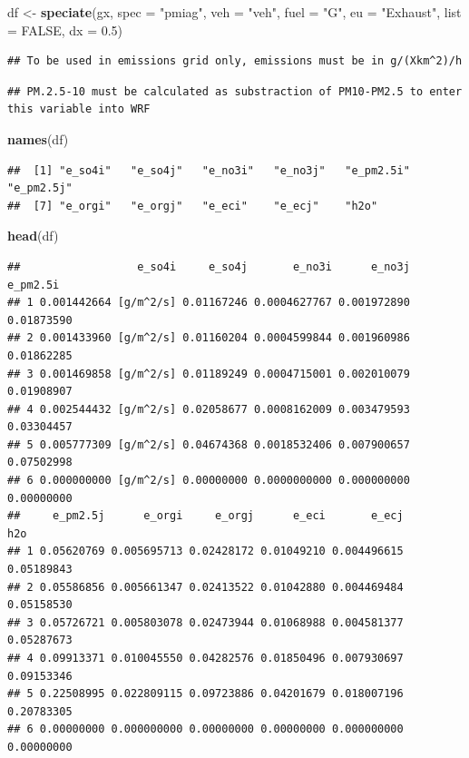 \documentclass[12pt,graybox,envcountchap,sectrefs]{krantz}
\makeatletter
\newenvironment{Shaded}{\begin{snugshade}}{\end{snugshade}}
\newcommand{\KeywordTok}[1]{\textcolor[rgb]{0.13,0.29,0.53}{\textbf{#1}}}
\newcommand{\DataTypeTok}[1]{\textcolor[rgb]{0.13,0.29,0.53}{#1}}
\newcommand{\FloatTok}[1]{\textcolor[rgb]{0.00,0.00,0.81}{#1}}
\newcommand{\StringTok}[1]{\textcolor[rgb]{0.31,0.60,0.02}{#1}}
\newcommand{\OtherTok}[1]{\textcolor[rgb]{0.56,0.35,0.01}{#1}}
\newcommand{\NormalTok}[1]{#1}
\newenvironment{kframe}{%
\medskip{}
\setlength{\fboxsep}{.8em}
 \def\at@end@of@kframe{}%
 \ifinner\ifhmode%
  \def\at@end@of@kframe{\end{minipage}}%
  \begin{minipage}{\columnwidth}%
 \fi\fi%
 \def\FrameCommand##1{\hskip\@totalleftmargin \hskip-\fboxsep
 \colorbox{shadecolor}{##1}\hskip-\fboxsep
     \hskip-\linewidth \hskip-\@totalleftmargin \hskip\columnwidth}%
 \MakeFramed {\advance\hsize-\width
   \@totalleftmargin\z@ \linewidth\hsize
   \@setminipage}}%
 {\par\unskip\endMakeFramed%
 \at@end@of@kframe}
\renewenvironment{Shaded}{\begin{kframe}}{\end{kframe}}
\theoremstyle{definition}
\theoremstyle{definition}
\theoremstyle{definition}
\theoremstyle{remark}
\makeatother
\begin{document}
\begin{Shaded}
\begin{Highlighting}[]
\NormalTok{df <-}\StringTok{ }\KeywordTok{speciate}\NormalTok{(gx, }\DataTypeTok{spec =} \StringTok{"pmiag"}\NormalTok{, }\DataTypeTok{veh =} \StringTok{"veh"}\NormalTok{, }\DataTypeTok{fuel =} \StringTok{"G"}\NormalTok{,}
               \DataTypeTok{eu =} \StringTok{"Exhaust"}\NormalTok{, }\DataTypeTok{list =} \OtherTok{FALSE}\NormalTok{, }\DataTypeTok{dx =} \FloatTok{0.5}\NormalTok{)}
\end{Highlighting}
\end{Shaded}

\begin{verbatim}
## To be used in emissions grid only, emissions must be in g/(Xkm^2)/h
\end{verbatim}

\begin{verbatim}
## PM.2.5-10 must be calculated as substraction of PM10-PM2.5 to enter this variable into WRF
\end{verbatim}

\begin{Shaded}
\begin{Highlighting}[]
\KeywordTok{names}\NormalTok{(df)}
\end{Highlighting}
\end{Shaded}

\begin{verbatim}
##  [1] "e_so4i"   "e_so4j"   "e_no3i"   "e_no3j"   "e_pm2.5i" "e_pm2.5j"
##  [7] "e_orgi"   "e_orgj"   "e_eci"    "e_ecj"    "h2o"
\end{verbatim}

\begin{Shaded}
\begin{Highlighting}[]
\KeywordTok{head}\NormalTok{(df)}
\end{Highlighting}
\end{Shaded}

\begin{verbatim}
##                  e_so4i     e_so4j       e_no3i      e_no3j   e_pm2.5i
## 1 0.001442664 [g/m^2/s] 0.01167246 0.0004627767 0.001972890 0.01873590
## 2 0.001433960 [g/m^2/s] 0.01160204 0.0004599844 0.001960986 0.01862285
## 3 0.001469858 [g/m^2/s] 0.01189249 0.0004715001 0.002010079 0.01908907
## 4 0.002544432 [g/m^2/s] 0.02058677 0.0008162009 0.003479593 0.03304457
## 5 0.005777309 [g/m^2/s] 0.04674368 0.0018532406 0.007900657 0.07502998
## 6 0.000000000 [g/m^2/s] 0.00000000 0.0000000000 0.000000000 0.00000000
##     e_pm2.5j      e_orgi     e_orgj      e_eci       e_ecj        h2o
## 1 0.05620769 0.005695713 0.02428172 0.01049210 0.004496615 0.05189843
## 2 0.05586856 0.005661347 0.02413522 0.01042880 0.004469484 0.05158530
## 3 0.05726721 0.005803078 0.02473944 0.01068988 0.004581377 0.05287673
## 4 0.09913371 0.010045550 0.04282576 0.01850496 0.007930697 0.09153346
## 5 0.22508995 0.022809115 0.09723886 0.04201679 0.018007196 0.20783305
## 6 0.00000000 0.000000000 0.00000000 0.00000000 0.000000000 0.00000000
\end{verbatim}
\end{document}
